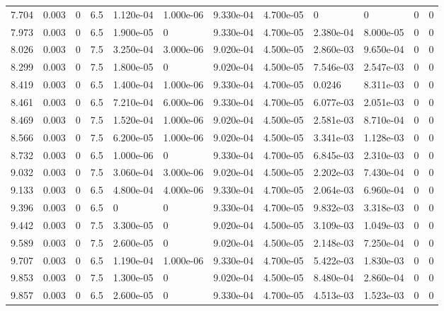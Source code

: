 \documentclass[preview]{standalone}
\begin{document}
{{{\begin{tabular}{L{1.2cm}C{1.2cm} C{0.3cm}C{0.5cm} C{1.4cm}C{1.4cm} C{1.4cm}C{1.4cm} C{1.6cm}C{1.6cm} C{1.6cm}C{1.6cm}}
  7.704  &  0.003  & 0     & 6.5 &  1.120e-04  & 1.000e-06  &  9.330e-04&   4.700e-05& 0 & 0   &  0 & 0  \\ 
  7.973  &  0.003  & 0     & 6.5 &  1.900e-05  & 0  &  9.330e-04&   4.700e-05& 2.380e-04 & 8.000e-05   &  0 & 0  \\ 
  8.026  &  0.003  & 0     & 7.5 &  3.250e-04  & 3.000e-06  &  9.020e-04&   4.500e-05& 2.860e-03 & 9.650e-04   &  0 & 0  \\ 
  8.299  &  0.003  & 0     & 7.5 &  1.800e-05  & 0  &  9.020e-04&   4.500e-05& 7.546e-03 & 2.547e-03   &  0 & 0  \\ 
  8.419  &  0.003  & 0     & 6.5 &  1.400e-04  & 1.000e-06  &  9.330e-04&   4.700e-05& 0.0246 & 8.311e-03   &  0 & 0  \\ 
  8.461  &  0.003  & 0     & 6.5 &  7.210e-04  & 6.000e-06  &  9.330e-04&   4.700e-05& 6.077e-03 & 2.051e-03   &  0 & 0  \\ 
  8.469  &  0.003  & 0     & 7.5 &  1.520e-04  & 1.000e-06  &  9.020e-04&   4.500e-05& 2.581e-03 & 8.710e-04   &  0 & 0  \\ 
  8.566  &  0.003  & 0     & 7.5 &  6.200e-05  & 1.000e-06  &  9.020e-04&   4.500e-05& 3.341e-03 & 1.128e-03   &  0 & 0  \\ 
  8.732  &  0.003  & 0     & 6.5 &  1.000e-06  & 0  &  9.330e-04&   4.700e-05& 6.845e-03 & 2.310e-03   &  0 & 0  \\ 
  9.032  &  0.003  & 0     & 7.5 &  3.060e-04  & 3.000e-06  &  9.020e-04&   4.500e-05& 2.202e-03 & 7.430e-04   &  0 & 0  \\ 
  9.133  &  0.003  & 0     & 6.5 &  4.800e-04  & 4.000e-06  &  9.330e-04&   4.700e-05& 2.064e-03 & 6.960e-04   &  0 & 0  \\ 
  9.396  &  0.003  & 0     & 6.5 &  0  & 0  &  9.330e-04&   4.700e-05& 9.832e-03 & 3.318e-03   &  0 & 0  \\ 
  9.442  &  0.003  & 0     & 7.5 &  3.300e-05  & 0  &  9.020e-04&   4.500e-05& 3.109e-03 & 1.049e-03   &  0 & 0  \\ 
  9.589  &  0.003  & 0     & 7.5 &  2.600e-05  & 0  &  9.020e-04&   4.500e-05& 2.148e-03 & 7.250e-04   &  0 & 0  \\ 
  9.707  &  0.003  & 0     & 6.5 &  1.190e-04  & 1.000e-06  &  9.330e-04&   4.700e-05& 5.422e-03 & 1.830e-03   &  0 & 0  \\ 
  9.853  &  0.003  & 0     & 7.5 &  1.300e-05  & 0  &  9.020e-04&   4.500e-05& 8.480e-04 & 2.860e-04   &  0 & 0  \\ 
  9.857  &  0.003  & 0     & 6.5 &  2.600e-05  & 0  &  9.330e-04&   4.700e-05& 4.513e-03 & 1.523e-03   &  0 & 0  \\ 

\end{tabular}}}}
\end{document}

